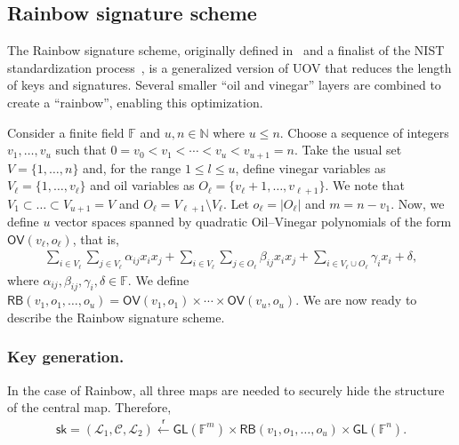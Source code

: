 \documentclass[english]{ufsc-thesis-rn46-2019/ufsc-thesis-rn46-2019}
\newcommand{\random}{\overset{\mathsf{r}}{\gets}}
\theoremstyle{definition}
\begin{document}
\subsection{Rainbow signature scheme}\label{subsec:rainbow}

The Rainbow signature scheme, originally defined in~\cite{Ding:200506} and
a finalist of the NIST standardization process~\cite[Sec.~3.20]{Alagic:202007},
is a generalized version of UOV that reduces the length of keys and
signatures. Several smaller ``oil and vinegar'' layers are combined to create
a ``rainbow'', enabling this optimization.

Consider a finite field $\mathbb{F}$ and $u, n \in \mathbb{N}$ where
$u \leq n$. Choose a sequence of integers $v_{1}, \dots, v_{u}$ such that
$0 = v_{0} < v_{1} < \cdots < v_{u} < v_{u + 1} = n$. Take the usual set
$V = \{1, \dots, n\}$ and, for the range $1 \leq l \leq u$, define vinegar
variables as $V_{\ell} = \{1, \dots, v_{\ell}\}$ and oil variables as
$O_{\ell} = \{v_{\ell} + 1, \dots, v_{\ell + 1}\}$. We note that
$V_{1} \subset \dots \subset V_{u + 1} = V$ and
$O_{\ell} = V_{\ell + 1} \setminus V_{\ell}$. Let $o_{\ell} = |O_{\ell}|$ and
$m = n - v_{1}$. Now, we define $u$ vector spaces spanned by quadratic
Oil--Vinegar polynomials of the form $\mathsf{OV}(v_{\ell}, o_{\ell})$, that
is,
\begin{align}\label{eq:oil-vinegar-space}
  \sum_{i \in V_{\ell}} \sum_{j \in V_{\ell}} \alpha_{ij} x_{i} x_{j}
    + \sum_{i \in V_{\ell}} \sum_{j \in O_{\ell}} \beta_{ij} x_{i} x_{j}
    + \sum_{i \in V_{\ell} \cup O_{\ell}} \gamma_{i} x_{i}
    + \delta,
\end{align}
where $\alpha_{ij}, \beta_{ij}, \gamma_{i}, \delta \in \mathbb{F}$. We define
$\mathsf{RB}(v_{1}, o_{1}, \dots, o_{u})
  = \mathsf{OV}(v_{1}, o_{1}) \times \cdots \times \mathsf{OV}(v_{u}, o_{u})$.
We are now ready to describe the Rainbow signature scheme.

\subsubsection{Key generation.}

In the case of Rainbow, all three maps are needed to securely hide the
structure of the central map. Therefore,
\begin{align}\label{eq:sk-rainbow}
  \mathsf{sk} = (\mathcal{L}_{1}, \mathcal{C}, \mathcal{L}_{2})
    \random \mathsf{GL}(\mathbb{F}^{m})
      \times \mathsf{RB}(v_{1}, o_{1}, \dots, o_{u})
      \times \mathsf{GL}(\mathbb{F}^{n}).
\end{align}
\end{document}
